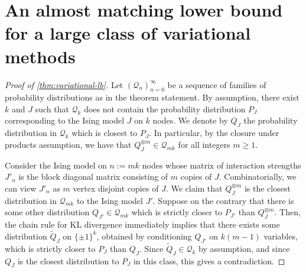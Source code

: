 \documentclass[final, 12pt]{colt2018}
\theoremstyle{definition}
\theoremstyle{plain}
\begin{document}
\section{An almost matching lower bound for a large class of variational methods}
\begin{proof}[Proof of \cref{thm:variational-lb}]
Let $(\mathcal{Q}_n)_{n = 0}^{\infty}$ be a sequence of families
of probability distributions as in the theorem statement. By assumption, there exist $k$ and $J$ such that $\mathcal{Q}_k$ does not contain the probability distribution $P_J$ corresponding to the Ising model $J$ on $k$ nodes. We denote by $Q_J$ the probability distribution in $\mathcal{Q}_k$ which is closest to $P_J$. In particular, by the closure under products assumption, we have that $Q_J^{\otimes m} \in \mathcal{Q}_{mk}$ for all integers $m \geq 1$. 


Consider the Ising model on $n:= mk$ nodes whose matrix of interaction strengths $J'_n$ is the block diagonal matrix consisting of $m$ copies of $J$. Combinatorially, we can view $J'_n$ as $m$ vertex disjoint copies of $J$. 
We claim that $Q_J ^{\otimes m}$ is the
closest distribution in $\mathcal{Q}_{mk}$ to the Ising model $J'$. Suppose on the contrary that there is some other distribution $Q_{J'} \in \mathcal{Q}_{mk}$ which is strictly closer to $P_{J'}$ than $Q_J ^{\otimes m}$. Then, the chain rule for KL divergence immediately implies that there exists some distribution $\tilde{Q}_J$ on $\{\pm 1\}^{k}$, obtained by conditioning $Q_{J'}$ on $k(m-1)$ variables, which is strictly closer to $P_J$ than $Q_J$. Since $\tilde{Q}_J \in \mathcal{Q}_k$ by assumption, and since $Q_J$ is the closest distribution to $P_J$ in this class, this gives a contradiction. 


\end{proof}
\end{document}
